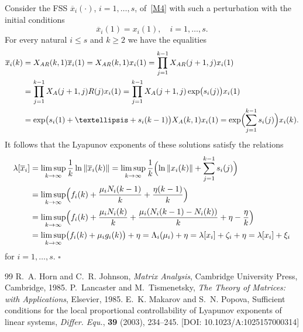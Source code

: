 \documentclass[10pt,a4paper]{amsart}
\theoremstyle{plain}
\begin{document}
Consider the FSS $\overline{x}_{i}(\cdot )$, $i=1,\ldots ,s$, of~\eqref{M4}
with such a perturbation with the initial conditions%
\begin{equation*}
\overline{x}_{i}( 1) =x_{i}( 1) ,\quad i=1,\ldots ,s.
\end{equation*}%
For every natural $i\le s$ and $k\ge 2$ we have the equalities
\begin{equation*}
\begin{split}
\overline{x}_{i}(k)&=X_{AR}(k,1)\overline{x}_{i}(1)=X_{AR}(k,1)x_{i}(1)=\prod_{j=1}^{k-1}X_{AR}(j+1,j)x_{i}(1)\\
&=\prod_{j=1}^{k-1}X_{A}(j+1,j)R(j)x_{i}(1)=
\prod_{j=1}^{k-1}X_{A}(j+1,j)\exp\bigl(s_i(j)\bigr)x_{i}(1)\\
&=\exp\bigl(s_i(1)+\ldots+s_{i}(k-1)\bigr)X_A(k,1)x_i(1)=\exp\Bigl(\sum_{j=1}^{k-1}s_i(j)\Bigr)x_i(k).
\end{split}
\end{equation*}
It follows that
the Lyapunov exponents of these solutions satisfy the relations
\begin{equation*}
\begin{split}
\lambda[\overline{x}_{i}] 
&=\limsup_{k\to \infty }\frac{1}{k}\ln\|\overline{x}_{i}(k)\| 
=\limsup_{k\to \infty }\frac{1}{k}\Bigl(\ln\|x_{i}(k)\| +\sum\limits_{j=1}^{k-1}s_{i}(j)\Bigr)\\
&=\limsup_{k\to\infty}\Bigl(f_{i}(k)+\frac{\mu_{i}N_{i}(k-1)}{k}+\frac{\eta(k-1)}{k}\Bigr)\\ 
&=\limsup_{k\to \infty }\Bigl(f_{i}(k)+\frac{\mu_{i}N_{i}(k)}{k}+\frac{\mu_i(N_i(k-1)-N_i(k))}{k}+\eta-\frac{\eta}{k}\Bigr)\\
&=\limsup_{k\to \infty }\bigl(f_{i}(k)+\mu_{i}g_{i}(k)\bigr) +\eta= 
\Lambda _{i}( \mu _{i}) +\eta =\lambda [ x_{i}] +\zeta_{i}+\eta
=\lambda [ x_{i}] +\xi_{i}
\end{split}
\end{equation*}%
for $i=1,\dots ,s$. 
\hfill $\square$

\begin{thebibliography}{99}
 \newblock R.~A. Horn and C.~R. Johnson, \newblock \emph{Matrix Analysis}, \newblock Cambridge University Press, Cambridge, 1985.
 \newblock P.~Lancaster and M.~Tismenetsky, \newblock \emph{The Theory of Matrices: with Applications}, \newblock Elsevier, 1985.
 \newblock E.~K. Makarov and S.~N. Popova, \newblock Sufficient conditions for the local proportional controllability of {Lyapunov} exponents of linear systems, \newblock \emph{Differ. Equ.}, \textbf{39} (2003), 234--245. [DOI: 10.1023/A:1025157000314]
\end{thebibliography}
\end{document}
